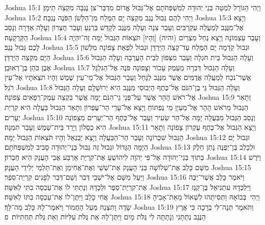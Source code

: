 Joshua 15:1	וַיְהִי הַגּוֹרָל לְמַטֵּה בְּנֵי יְהוּדָה לְמִשְׁפְּחֹתָם אֶל־גְּבוּל אֱדוֹם מִדְבַּר־צִן נֶגְבָּה מִקְצֵה תֵימָן׃
Joshua 15:2	וַיְהִי לָהֶם גְּבוּל נֶגֶב מִקְצֵה יָם הַמֶּלַח מִן־הַלָּשֹׁן הַפֹּנֶה נֶגְבָּה׃
Joshua 15:3	וְיָצָא אֶל־מִנֶּגֶב לְמַעֲלֵה עַקְרַבִּים וְעָבַר צִנָה וְעָלָה מִנֶּגֶב לְקָדֵשׁ בַּרְנֵעַ וְעָבַר חֶצְרוֹן וְעָלָה אַדָּרָה וְנָסַב הַקַּרְקָעָה׃
Joshua 15:4	וְעָבַר עַצְמוֹנָה וְיָצָא נַחַל מִצְרַיִם (והיה) [וְהָיוּ] תֹּצְאוֹת הַגְּבוּל יָמָּה זֶה־יִהְיֶה לָכֶם גְּבוּל נֶגֶב׃
Joshua 15:5	וּגְבוּל קֵדְמָה יָם הַמֶּלַח עַד־קְצֵה הַיַּרְדֵּן וּגְבוּל לִפְאַת צָפוֹנָה מִלְּשׁוֹן הַיָּם מִקְצֵה הַיַּרְדֵּן׃
Joshua 15:6	וְעָלָה הַגְּבוּל בֵּית חגְלָה וְעָבַר מִצְּפוֹן לְבֵית הָעֲרָבָה וְעָלָה הַגְּבוּל אֶבֶן בֹּהַן בֶּן־רְאוּבֵן׃
Joshua 15:7	וְעָלָה הַגְּבוּל  דְּבִרָה מֵעֵמֶק עָכוֹר וְצָפוֹנָה פֹּנֶה אֶל־הַגִּלְגָּל אֲשֶׁר־נֹכַח לְמַעֲלֵה אֲדֻמִּים אֲשֶׁר מִנֶּגֶב לַנָּחַל וְעָבַר הַגְּבוּל אֶל־מֵי־עֵין שֶׁמֶשׁ וְהָיוּ תֹצְאֹתָיו אֶל־עֵין רֹגֵל׃
Joshua 15:8	וְעָלָה הַגְּבוּל גֵּי בֶן־הִנֹּם אֶל־כֶּתֶף הַיְבוּסִי מִנֶּגֶב הִיא יְרוּשָׁלָ͏ִם וְעָלָה הַגְּבוּל אֶל־רֹאשׁ הָהָר אֲשֶׁר עַל־פְּנֵי גֵי־הִנֹּם יָמָּה אֲשֶׁר בִּקְצֵה עֵמֶק־רְפָאִים צָפוֹנָה׃
Joshua 15:9	וְתָאַר הַגְּבוּל מֵרֹאשׁ הָהָר אֶל־מַעְיַן מֵי נֶפְתּוֹחַ וְיָצָא אֶל־עָרֵי הַר־עֶפְרוֹן וְתָאַר הַגְּבוּל בַּעֲלָה הִיא קִרְיַת יְעָרִים׃
Joshua 15:10	וְנָסַב הַגְּבוּל מִבַּעֲלָה יָמָּה אֶל־הַר שֵׂעִיר וְעָבַר אֶל־כֶּתֶף הַר־יְעָרִים מִצָּפוֹנָה הִיא כְסָלוֹן וְיָרַד בֵּית־שֶׁמֶשׁ וְעָבַר תִּמְנָה׃
Joshua 15:11	וְיָצָא הַגְּבוּל אֶל־כֶּתֶף עֶקְרוֹן צָפוֹנָה וְתָאַר הַגְּבוּל שִׁכְּרוֹנָה וְעָבַר הַר־הַבַּעֲלָה וְיָצָא יַבְנְאֵל וְהָיוּ תֹּצְאוֹת הַגְּבוּל יָמָּה׃
Joshua 15:12	וּגְבוּל יָם הַיָּמָּה הַגָּדוֹל וּגְבוּל זֶה גְּבוּל בְּנֵי־יְהוּדָה סָבִיב לְמִשְׁפְּחֹתָם׃
Joshua 15:13	וּלְכָלֵב בֶּן־יְפֻנֶּה נָתַן חֵלֶק בְּתוֹךְ בְּנֵי־יְהוּדָה אֶל־פִּי יְהֹוָה לִיהוֹשֻׁעַ אֶת־קִרְיַת אַרְבַּע אֲבִי הָעֲנָק הִיא חֶבְרוֹן׃
Joshua 15:14	וַיֹּרֶשׁ מִשָּׁם כָּלֵב אֶת־שְׁלוֹשָׁה בְּנֵי הָעֲנָק אֶת־שֵׁשַׁי וְאֶת־אֲחִימַן וְאֶת־תַּלְמַי יְלִידֵי הָעֲנָק׃
Joshua 15:15	וַיַּעַל מִשָּׁם אֶל־יֹשְׁבֵי דְּבִר וְשֵׁם־דְּבִר לְפָנִים קִרְיַת־סֵפֶר׃
Joshua 15:16	וַיֹּאמֶר כָּלֵב אֲשֶׁר־יַכֶּה אֶת־קִרְיַת־סֵפֶר וּלְכָדָהּ וְנָתַתִּי לוֹ אֶת־עַכְסָה בִתִּי לְאִשָּׁה׃
Joshua 15:17	וַיִּלְכְּדָהּ עתְנִיאֵל בֶּן־קְנַז אֲחִי כָלֵב וַיִּתֶּן־לוֹ אֶת־עַכְסָה בִתּוֹ לְאִשָּׁה׃
Joshua 15:18	וַיְהִי  בְּבוֹאָהּ וַתְּסִיתֵהוּ לִשְׁאוֹל מֵאֵת־אָבִיהָ שָׂדֶה וַתִּצְנַח מֵעַל הַחֲמוֹר וַיֹּאמֶר־לָהּ כָּלֵב מַה־לָּךְ׃
Joshua 15:19	וַתֹּאמֶר תְּנָה־לִּי בְרָכָה כִּי אֶרֶץ הַנֶּגֶב נְתַתָּנִי וְנָתַתָּה לִי גֻּלֹּת מָיִם וַיִּתֶּן־לָהּ אֵת גֻּלֹּת עִלִּיּוֹת וְאֵת גֻּלֹּת תַּחְתִּיּוֹת׃ {פ}
